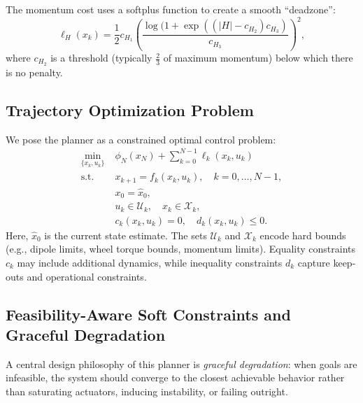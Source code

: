 \documentclass[conference]{IEEEtran}
\begin{document}
The momentum cost uses a softplus function to create a smooth ``deadzone'':
\begin{equation}\label{eq:momentum_cost}
    \ell_H(x_k) = \frac{1}{2} c_{H_1} \left(\frac{\log(1+\exp({(|H|-c_{H_2})c_{H_3}})}{c_{H_3}}\right)^2,
\end{equation}
where $c_{H_2}$ is a threshold (typically $\frac{2}{3}$ of maximum momentum) below which there is no penalty.

\subsection{Trajectory Optimization Problem}\label{subsec:opt_problem}

We pose the planner as a constrained optimal control problem:
\begin{align}
\min_{\{x_k,u_k\}} \; & \phi_N(x_N) + \sum_{k=0}^{N-1} \ell_k(x_k,u_k) \label{eq:opt_cost}\\
\text{s.t. } \; & x_{k+1}=f_k(x_k,u_k), \quad k = 0,\dots,N-1, \label{eq:opt_dynamics}\\
& x_0 = \hat{x}_0, \label{eq:opt_initial}\\
& u_k \in \mathcal{U}_k, \quad x_k \in \mathcal{X}_k, \label{eq:opt_bounds}\\
& c_k(x_k,u_k) = 0, \quad d_k(x_k,u_k) \le 0. \label{eq:opt_constraints}
\end{align}
Here, $\hat{x}_0$ is the current state estimate. The sets $\mathcal{U}_k$ and $\mathcal{X}_k$ encode hard bounds (e.g., dipole limits, wheel torque bounds, momentum limits). Equality constraints $c_k$ may include additional dynamics, while inequality constraints $d_k$ capture keep-outs and operational constraints.

\subsection{Feasibility-Aware Soft Constraints and Graceful Degradation}\label{subsec:soft_constraints}

A central design philosophy of this planner is \textit{graceful degradation}: when goals are infeasible, the system should converge to the closest achievable behavior rather than saturating actuators, inducing instability, or failing outright.
\end{document}
